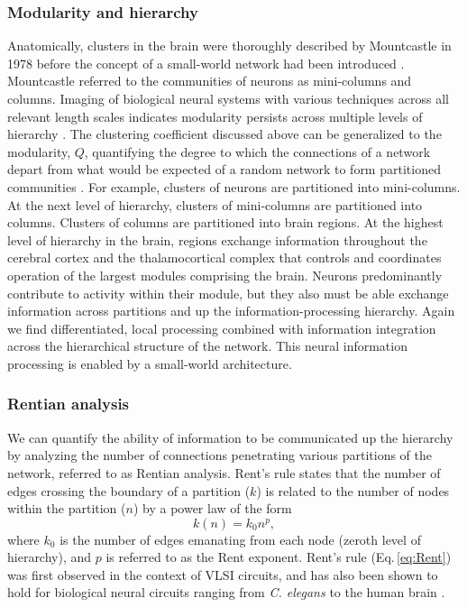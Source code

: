 \documentclass[twocolumn]{article}
\begin{document}
\subsubsection{Modularity and hierarchy}
Anatomically, clusters in the brain were thoroughly described by Mountcastle in 1978 \cite{mo1978} before the concept of a small-world network had been introduced \cite{wast1998}. Mountcastle referred to the communities of neurons as mini-columns and columns. Imaging of biological neural systems with various techniques across all relevant length scales indicates modularity persists across multiple levels of hierarchy \cite{beba2017}. The clustering coefficient discussed above can be generalized to the modularity, $Q$, quantifying the degree to which the connections of a network depart from what would be expected of a random network to form partitioned communities \cite{rusp2010,beba2017}. For example, clusters of neurons are partitioned into mini-columns. At the next level of hierarchy, clusters of mini-columns are partitioned into columns. Clusters of columns are partitioned into brain regions. At the highest level of hierarchy in the brain, regions exchange information throughout the cerebral cortex and the thalamocortical complex that controls and coordinates operation of the largest modules comprising the brain. Neurons predominantly contribute to activity within their module, but they also must be able exchange information across partitions and up the information-processing hierarchy. Again we find differentiated, local processing combined with information integration across the hierarchical structure of the network. This neural information processing is enabled by a small-world architecture.

\subsubsection{Rentian analysis}
We can quantify the ability of information to be communicated up the hierarchy by analyzing the number of connections penetrating various partitions of the network, referred to as Rentian analysis. Rent's rule states that the number of edges crossing the boundary of a partition ($k$) is related to the number of nodes within the partition ($n$) by a power law of the form
\begin{equation}
\label{eq:Rent}
k(n) = k_0 n^p,
\end{equation}
where $k_0$ is the number of edges emanating from each node (zeroth level of hierarchy), and $p$ is referred to as the Rent exponent. Rent's rule (Eq.\,\ref{eq:Rent}) was first observed in the context of VLSI circuits, and has also been shown to hold for biological neural circuits ranging from \textit{C. elegans} to the human brain \cite{bagr2010}. 
\end{document}
